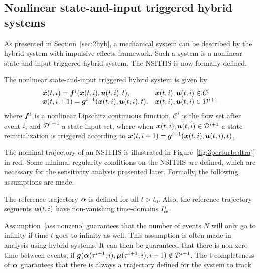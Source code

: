 \documentclass[../DC2017114Bouma.tex]{subfiles}
\begin{document}
\subsection{Nonlinear state-and-input triggered hybrid systems}
As presented in Section~\ref{sec:2hyb}, a mechanical system can be described by the hybrid system with impulsive effects framework. Such a system is a nonlinear state-and-input triggered hybrid system. The NSITHS is now formally defined.

\begin{mydef}[NSITHS]\label{def:3nsiths}
The nonlinear state-and-input triggered hybrid system is given by
\begin{equation}
\begin{array}{ll}
\dot{{\boldsymbol{x}}}(t,i) ={\boldsymbol{f}}^i({\boldsymbol{x}}(t,i),{\boldsymbol{u}}(t,i),t),& {\boldsymbol{x}}(t,i),{\boldsymbol{u}}(t,i)\in \mathcal{C}^i\\
{\boldsymbol{x}}(t,i+1) = {\boldsymbol{g}}^{i+1}({\boldsymbol{x}}(t,i),{\boldsymbol{u}}(t,i),t),& {\boldsymbol{x}}(t,i),{\boldsymbol{u}}(t,i)\in \mathcal{D}^{i+1}
\end{array}\label{eq:3hybimp}
\end{equation}
where ${\boldsymbol{f}}^i$ is a nonlinear Lipschitz continuous function. $\mathcal{C}^i$ is the flow set after event $i$, and $\mathcal{D}^{i+1}$ a state-input set, where when ${\boldsymbol{x}}(t,i),{\boldsymbol{u}}(t,i)\in \mathcal{D}^{i+1}$ a state reinitialization is triggered according to ${\boldsymbol{x}}(t,i+1) = {\boldsymbol{g}}^{i+1}({\boldsymbol{x}}(t,i),{\boldsymbol{u}}(t,i),t)$.
\end{mydef} 

The nominal trajectory of an NSITHS is illustrated in Figure~\ref{fig:3perturbedtraj} in red. Some minimal regularity conditions on the NSITHS are defined, which are necessary for the sensitivity analysis presented later. Formally, the following assumptions are made.

\begin{myass}
The reference trajectory $\boldsymbol{\alpha}$ is defined for all $t>t_0$. Also, the reference trajectory segments $\boldsymbol{\alpha}(t,i)$ have non-vanishing time-domains $I_{\boldsymbol{\alpha}}^i$.\label{ass:nonzeno}
\end{myass}

Assumption~\ref{ass:nonzeno} guarantees that the number of events $N$ will only go to infinity if time $t$ goes to infinity as well. This assumption is often made in analysis using hybrid systems. It can then be guaranteed that there is non-zero time between events, if ${\boldsymbol{g}}(\boldsymbol{\alpha}(\tau^{i+1},i),\boldsymbol{\mu}(\tau^{i+1},i),i+1)\notin \mathcal{D}^{i+1}$. The t-completeness of $\boldsymbol{\alpha}$ guarantees that there is always a trajectory defined for the system to track.
\end{document}
